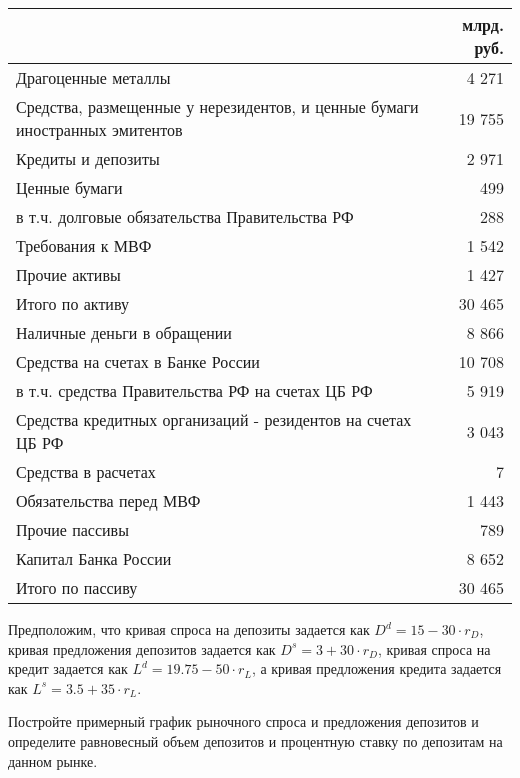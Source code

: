 \documentclass[12pt, table]{exam}
\begin{document}
\begin{questions}
\begin{solution}[12em]
	\small
	\begin{tabularx}{\linewidth}[b]{@{}>{\raggedright\arraybackslash}Xr@{}}		& млрд. руб.\\
		\toprule
	    Драгоценные металлы &               4 271    \\
		Средства, размещенные у нерезидентов, и ценные бумаги иностранных эмитентов &             19 755    \\
		Кредиты и депозиты &               2 971    \\
		Ценные бумаги &                  499    \\
		в т.ч. долговые обязательства Правительства РФ &                  288    \\
		Требования к МВФ &               1 542    \\
		Прочие активы &               1 427    \\
		Итого по активу &             30 465    \\
		\midrule
		Наличные деньги в обращении &               8 866    \\
		Средства на счетах в Банке России &             10 708    \\
		в т.ч. средства Правительства РФ на счетах ЦБ РФ &               5 919    \\
		Средства кредитных организаций - резидентов на счетах ЦБ РФ &               3 043    \\
		Средства в расчетах &                      7    \\
		Обязательства перед МВФ &               1 443    \\
		Прочие пассивы &                  789    \\
		Капитал Банка России &               8 652    \\
		Итого по пассиву &             30 465    \\
		\bottomrule
	\end{tabularx}%
	\normalsize
\end{solution}

\pagebreak
\question[15] Предположим, что кривая спроса на депозиты задается как 
$D^d = 15 - 30 \cdot r_D$, кривая предложения депозитов задается как 
$D^s = 3 + 30 \cdot r_D$, кривая спроса на кредит задается как 
$L^d = 19.75 - 50 \cdot r_L $, а кривая предложения кредита задается как 
$L^s= 3.5 + 35 \cdot r_L$.
\noaddpoints

\begin{subparts}
	\subpart[5] Постройте примерный график рыночного спроса и предложения депозитов и определите равновесный объем депозитов и процентную ставку по депозитам на данном рынке.
	

\end{subparts}
\end{questions}
\end{document}

